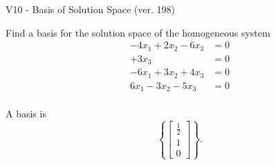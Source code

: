 \begin{exercise}
  \begin{exerciseTitle}V10 - Basis of Solution Space (ver. 198)\end{exerciseTitle}
  \begin{exerciseStatement}
    Find a basis for the solution space of the homogeneous system 
\begin{align*}
 -4 x_ 1 + 2 x_ 2 -6 x_ 3 &= 0  \\ 
  + 3 x_ 3 &= 0  \\ 
  -6 x_ 1 + 3 x_ 2 + 4 x_ 3 &= 0  \\ 
  6 x_ 1 -3 x_ 2 -5 x_ 3 &= 0  \\ 
 \end{align*}


 
  \end{exerciseStatement}

  \begin{exerciseAnswer}
   A basis is   
\[\left\{\left[\begin{array}{c}
\frac{1}{2} \\
1 \\
0
\end{array}\right]\right\}.\]

  


  \end{exerciseAnswer}
\end{exercise}